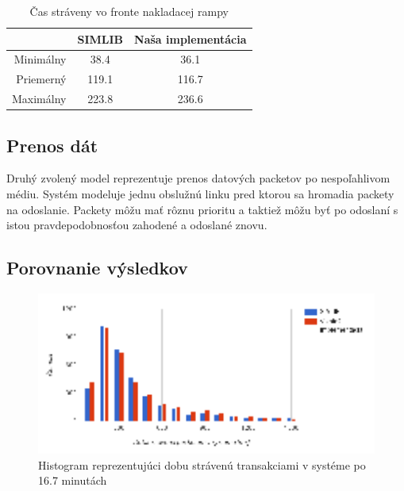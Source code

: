 \documentclass[11pt, a4paper, titlepage]{article}
\begin{document}
\begin{table}[h!]
\begin{center}
  \begin{tabular}{ r | c | c }
      & SIMLIB & Naša implementácia \\ \hline
    Minimálny & 38.4  & 36.1 \\ \hline
    Priemerný & 119.1 & 116.7 \\ \hline
    Maximálny & 223.8 & 236.6 \\ \hline
    \hline
  \end{tabular}
  \caption{Čas stráveny vo fronte nakladacej rampy}
\end{center}
\end{table}

\subsection{Prenos dát}
Druhý zvolený model reprezentuje prenos datových packetov po nespoľahlivom médiu\cite[slide 14]{demo1}.
Systém modeluje jednu obslužnú linku pred ktorou sa hromadia packety na odoslanie.
Packety môžu mať rôznu prioritu a taktiež môžu byť po odoslaní s istou pravdepodobnosťou zahodené a odoslané znovu.

\subsection*{Porovnanie výsledkov}

\begin{figure}[h!]
    \includegraphics[width=12cm]{graf_prenos.eps}
    \centering
    \caption{Histogram reprezentujúci dobu strávenú transakciami v systéme po 16.7 minutách}
\end{figure}
\end{document}
